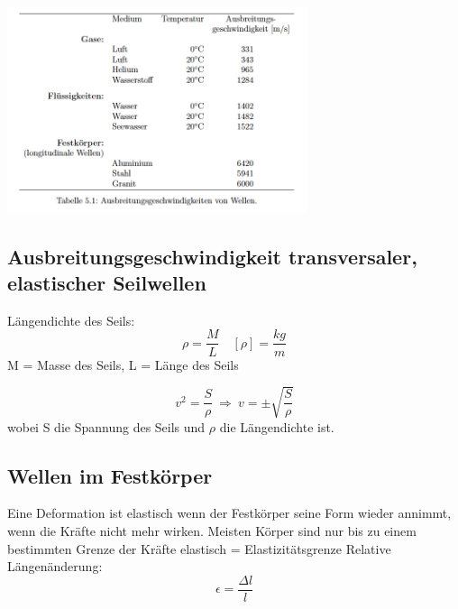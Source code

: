 \documentclass[7pt]{article}
\begin{document}
\begin{multicols*}{3}
\begin{center}
	\includegraphics[width=250pt]{images/wellenausbreitungsgeschwindigkeit.png}
\end{center}

\columnbreak

\subsection{Ausbreitungsgeschwindigkeit transversaler, elastischer Seilwellen}
L{\"a}ngendichte des Seils:
\begin{equation*}
 \rho = \frac{M}{L}\quad [\rho] = \frac{kg}{m}
\end{equation*}
M = Masse des Seils, L = L{\"a}nge des Seils\newline

\begin{equation*}
 v^2 = \frac{S}{\rho} \> \Longrightarrow \> v = \pm \sqrt{\frac{S}{\rho}}
\end{equation*}
wobei S die Spannung des Seils und $\rho$ die L{\"a}ngendichte ist.
\newline 
 
\subsection{Wellen im Festk{\"o}rper}
Eine Deformation ist elastisch wenn der Festk{\"o}rper seine Form wieder annimmt, wenn die Kr{\"a}fte nicht mehr wirken.
\newline
Meisten K{\"o}rper sind nur bis zu einem bestimmten Grenze der Kr{\"a}fte elastisch = Elastizit{\"a}tsgrenze \newline
Relative L{\"a}ngen{\"a}nderung:
\begin{equation*}
\epsilon = \frac{\Delta l }{l}
\end{equation*}


\end{multicols*}
\end{document}
